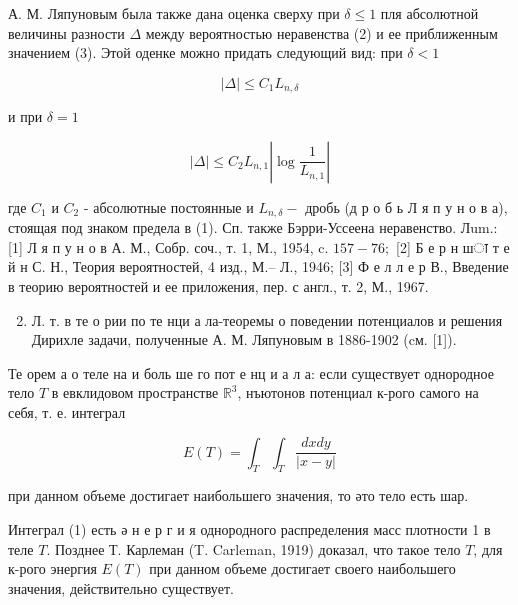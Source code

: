 \documentclass[10pt]{article}
\begin{document}
А. М. Ляпуновым была также дана оценка сверху при $\delta \leqslant 1$ пля абсолютной величины разности $\Delta$ между вероятностью неравенства (2) и ее приближенным значением (3). Этой оденке можно придать следующий вид: при $\delta<1$



\[

|\Delta| \leqslant C_{1} L_{n, \delta}

\]



и при $\delta=1$



\[

|\Delta| \leqslant C_{2} L_{n, 1}\left|\log \frac{1}{L_{n, 1}}\right|

\]



где $C_{1}$ и $C_{2}$ - абсолютные постоянные и $L_{n, \delta}-$ дробь (д р о б ь Л я п у н о в а), стоящая под знаком предела в (1). Сп. также Бэрри-Уссеена неравенство. Лum.: [1] Л я п у н о в А. М., Собр. соч., т. 1, М., 1954, c. $157-76 ;$ [2] Б е р н шा т е й н С. Н., Теория вероятностей, 4 изд., М.-- Л., 1946; [3] Ф е л л е р В., Введение в теорию вероятностей и ее приложения, пер. с англ., т. 2, М., 1967.



\begin{enumerate}

  \setcounter{enumi}{1}

  \item Л. т. в те о рии по те нци а ла-теоремы о поведении потенциалов и решения Дирихле задачи, полученные А. М. Ляпуновым в 1886-1902 (cм. [1]).

\end{enumerate}



Те орем а о теле на и боль ше го пот е нц и а л а: если существует однородное тело $T$ в евклидовом пространстве $\mathbb{R}^{3}$, нъютонов потенциал к-рого самого на себя, т. е. интеграл



\[

E(T)=\int_{T} \int_{T} \frac{d x d y}{|x-y|}

\]



при данном объеме достигает наибольшего значения, то әто тело есть шар.



Интеграл (1) есть ә н е р г и я однородного распределения масс плотности 1 в теле $T$. Позднее Т. Карлеман (T. Carleman, 1919) доказал, что такое тело $T$, для к-рого энергия $E(T)$ при данном объеме достигает своего наибольшего значения, действительно существует.
\end{document}
